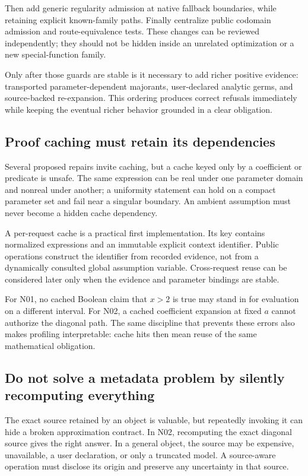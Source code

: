 \documentclass[11pt,letterpaper]{article}
\begin{document}
Then add generic regularity admission at native fallback boundaries, while retaining explicit known-family paths. Finally centralize public codomain admission and route-equivalence tests. These changes can be reviewed independently; they should not be hidden inside an unrelated optimization or a new special-function family.

Only after those guards are stable is it necessary to add richer positive evidence: transported parameter-dependent majorants, user-declared analytic germs, and source-backed re-expansion. This ordering produces correct refusals immediately while keeping the eventual richer behavior grounded in a clear obligation.

\subsection{Proof caching must retain its dependencies}
Several proposed repairs invite caching, but a cache keyed only by a coefficient or predicate is unsafe. The same expression can be real under one parameter domain and nonreal under another; a uniformity statement can hold on a compact parameter set and fail near a singular boundary. An ambient assumption must never become a hidden cache dependency.

A per-request cache is a practical first implementation. Its key contains normalized expressions and an immutable explicit context identifier. Public operations construct the identifier from recorded evidence, not from a dynamically consulted global assumption variable. Cross-request reuse can be considered later only when the evidence and parameter bindings are stable.

For N01, no cached Boolean claim that $x>2$ is true may stand in for evaluation on a different interval. For N02, a cached coefficient expansion at fixed $a$ cannot authorize the diagonal path. The same discipline that prevents these errors also makes profiling interpretable: cache hits then mean reuse of the same mathematical obligation.

\subsection{Do not solve a metadata problem by silently recomputing everything}
The exact source retained by an object is valuable, but repeatedly invoking it can hide a broken approximation contract. In N02, recomputing the exact diagonal source gives the right answer. In a general object, the source may be expensive, unavailable, a user declaration, or only a truncated model. A source-aware operation must disclose its origin and preserve any uncertainty in that source.
\end{document}
